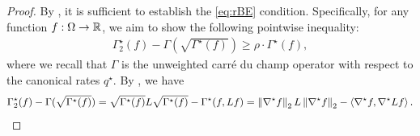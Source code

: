 \begin{proof}
    By , it is sufficient to establish the \ref{eq:rBE} condition.
    Specifically, for any function $f: \Omega \to \mathbb{R}$, we aim to show the following pointwise inequality:
    \begin{align*}
        \Gamma^\star_2(f) - \Gamma(\sqrt{\Gamma^\star(f)}) \ge \rho \cdot \Gamma^\star(f),
    \end{align*}
    where we recall that $\Gamma$ is the unweighted carr\'e du champ operator with respect to the canonical rates $q^\star$.
    By , we have
    \begin{align}
        \Gamma^\star_2(f) - \Gamma(\sqrt{\Gamma^\star(f)}) 
        = \sqrt{\Gamma^\star(f)} L \sqrt{\Gamma^\star(f)} - \Gamma^\star(f,Lf) 
        = \left\lVert \nabla^\star f \right\rVert_2 L \left\lVert \nabla^\star f \right\rVert_2 - \left\langle \nabla^\star f,\nabla^\star Lf\right\rangle. \label{eq:first-rBE}
    \end{align}


\end{proof}
